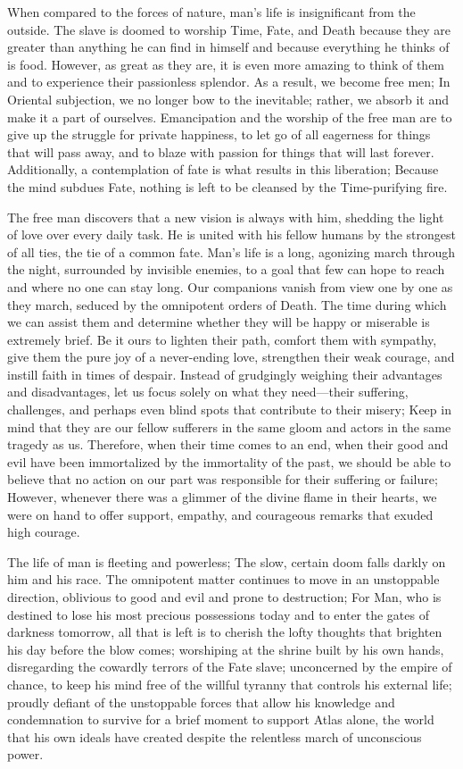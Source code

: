 \documentclass[a4paper,12pt]{book}[2004/02/16]
\theoremstyle{ilemma}
\theoremstyle{itheorem}
\theoremstyle{iother}
\theoremstyle{icorollary}
\theoremstyle{numcorollary}
\theoremstyle{idefinition}
\begin{document}
When compared to the forces of nature, man's life is insignificant from the outside. The slave is doomed to worship Time, Fate, and Death because they are greater than anything he can find in himself and because everything he thinks of is food.
However, as great as they are, it is even more amazing to think of them and to experience their passionless splendor. As a result, we become free men; In Oriental subjection, we no longer bow to the inevitable; rather, we absorb it and make it a part of ourselves. Emancipation and the worship of the free man are to give up the struggle for private happiness, to let go of all eagerness for things that will pass away, and to blaze with passion for things that will last forever. Additionally, a contemplation of fate is what results in this liberation; Because the mind subdues Fate, nothing is left to be cleansed by the Time-purifying fire.

The free man discovers that a new vision is always with him, shedding the light of love over every daily task. He is united with his fellow humans by the strongest of all ties, the tie of a common fate. Man's life is a long, agonizing march through the night, surrounded by invisible enemies, to a goal that few can hope to reach and where no one can stay long. Our companions vanish from view one by one as they march, seduced by the omnipotent orders of Death. The time during which we can assist them and determine whether they will be happy or miserable is extremely brief. Be it ours to lighten their path, comfort them with sympathy, give them the pure joy of a never-ending love, strengthen their weak courage, and instill faith in times of despair. Instead of grudgingly weighing their advantages and disadvantages, let us focus solely on what they need—their suffering, challenges, and perhaps even blind spots that contribute to their misery; Keep in mind that they are our fellow sufferers in the same gloom and actors in the same tragedy as us. Therefore, when their time comes to an end, when their good and evil have been immortalized by the immortality of the past, we should be able to believe that no action on our part was responsible for their suffering or failure; However, whenever there was a glimmer of the divine flame in their hearts, we were on hand to offer support, empathy, and courageous remarks that exuded high courage.

The life of man is fleeting and powerless; The slow, certain doom falls darkly on him and his race. The omnipotent matter continues to move in an unstoppable direction, oblivious to good and evil and prone to destruction; For Man, who is destined to lose his most precious possessions today and to enter the gates of darkness tomorrow, all that is left is to cherish the lofty thoughts that brighten his day before the blow comes; worshiping at the shrine built by his own hands, disregarding the cowardly terrors of the Fate slave; unconcerned by the empire of chance, to keep his mind free of the willful tyranny that controls his external life; proudly defiant of the unstoppable forces that allow his knowledge and condemnation to survive for a brief moment to support Atlas alone, the world that his own ideals have created despite the relentless march of unconscious power.
\end{document}
